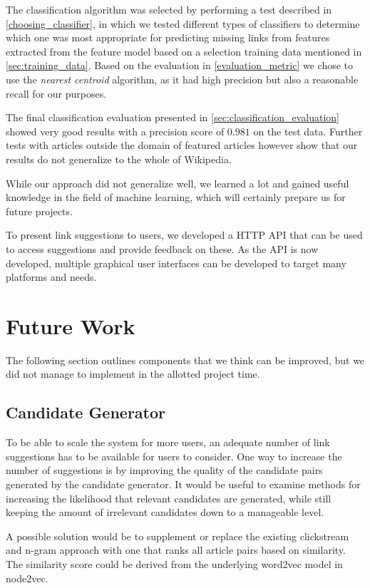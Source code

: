 The classification algorithm was selected by performing a test described in \cref{choosing_classifier}, in which we tested different types of classifiers to determine which one was most appropriate for predicting missing links from features extracted from the feature model based on a selection training data mentioned in \cref{sec:training_data}. Based on the evaluation in \cref{evaluation_metric} we chose to use the \emph{nearest centroid} algorithm, as it had high precision but also a reasonable recall for our purposes. 

The final classification evaluation presented in \cref{sec:classification_evaluation} showed very good results with a precision score of $0.981$ on the test data. Further tests with articles outside the domain of featured articles however show that our results do not generalize to the whole of Wikipedia. 

While our approach did not generalize well, we learned a lot and gained useful knowledge in the field of machine learning, which will certainly prepare us for future projects.

To present link suggestions to users, we developed a HTTP API that can be used to access suggestions and provide feedback on these. As the API is now developed, multiple graphical user interfaces can be developed to target many platforms and needs.

\section{Future Work}\label{sec:future_work}
The following section outlines components that we think can be improved, but we did not manage to implement in the allotted project time.

\subsection{Candidate Generator}
To be able to scale the system for more users, an adequate number of link suggestions has to be available for users to consider. One way to increase the number of suggestions is by improving the quality of the candidate pairs generated by the candidate generator. It would be useful to examine methods for increasing the likelihood that relevant candidates are generated, while still keeping the amount of irrelevant candidates down to a manageable level.

A possible solution would be to supplement or replace the existing clickstream and n-gram approach with one that ranks all article pairs based on similarity. The similarity score could be derived from the underlying word2vec model in node2vec.

